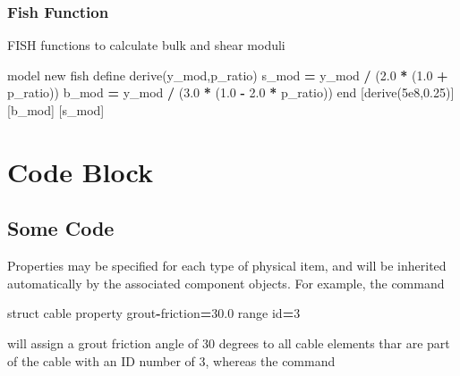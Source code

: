 \documentclass[a4paper, nobind]{templates/ociamthesis}
\newenvironment{Shaded}{\begin{snugshade}}{\end{snugshade}}
\newcommand{\BuiltInTok}[1]{#1}
\newcommand{\DecValTok}[1]{\textcolor[rgb]{0.00,0.00,0.81}{#1}}
\newcommand{\FloatTok}[1]{\textcolor[rgb]{0.00,0.00,0.81}{#1}}
\newcommand{\NormalTok}[1]{#1}
\newcommand{\OperatorTok}[1]{\textcolor[rgb]{0.81,0.36,0.00}{\textbf{#1}}}
\renewenvironment{Shaded}
{
  \vspace{10pt}%
  \begin{snugshade}%
}{%
  \end{snugshade}%
  \vspace{8pt}%
}
\begin{document}
\hypertarget{fish-function}{%
\subsection{Fish Function}\label{fish-function}}

FISH functions to calculate bulk and shear moduli

\begin{Shaded}
\begin{Highlighting}[]
\NormalTok{model new}
\NormalTok{fish define derive(y\_mod,p\_ratio)}
\NormalTok{    s\_mod }\OperatorTok{=}\NormalTok{ y\_mod }\OperatorTok{/}\NormalTok{ (}\FloatTok{2.0} \OperatorTok{*}\NormalTok{ (}\FloatTok{1.0} \OperatorTok{+}\NormalTok{ p\_ratio))}
\NormalTok{    b\_mod }\OperatorTok{=}\NormalTok{ y\_mod }\OperatorTok{/}\NormalTok{ (}\FloatTok{3.0} \OperatorTok{*}\NormalTok{ (}\FloatTok{1.0} \OperatorTok{{-}} \FloatTok{2.0} \OperatorTok{*}\NormalTok{ p\_ratio))}
\NormalTok{end}
\NormalTok{[derive(}\FloatTok{5e8}\NormalTok{,}\FloatTok{0.25}\NormalTok{)]}
\NormalTok{[b\_mod] }
\NormalTok{[s\_mod]}
\end{Highlighting}
\end{Shaded}

\newpage

\hypertarget{code-block}{%
\chapter{Code Block}\label{code-block}}

\hypertarget{some-code}{%
\section{Some Code}\label{some-code}}

Properties may be specified for each type of physical item, and will be
inherited automatically by the associated component objects. For
example, the command

\begin{Shaded}
\begin{Highlighting}[]
\NormalTok{struct cable }\BuiltInTok{property}\NormalTok{ grout}\OperatorTok{{-}}\NormalTok{friction}\OperatorTok{=}\FloatTok{30.0} \BuiltInTok{range} \BuiltInTok{id}\OperatorTok{=}\DecValTok{3}
\end{Highlighting}
\end{Shaded}

will assign a grout friction angle of 30 degrees to all cable elements
thar are part of the cable with an ID number of 3, whereas the command
\end{document}
